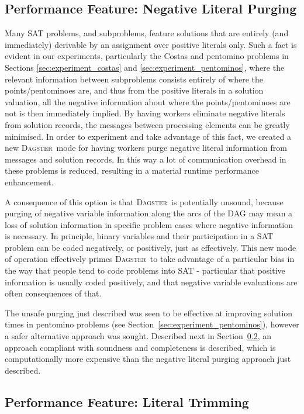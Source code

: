 \documentclass[10pt,a4paper,oneside,headinclude,footinclude,BCOR5mm]{scrartcl}
\newcommand{\dagster}{\textsc{Dagster}\xspace}
\begin{document}
\subsection{Performance Feature: Negative Literal Purging}\label{sec:negative_literal_purging}

Many SAT problems, and subproblems, feature solutions that are entirely (and immediately) derivable by an assignment over positive literals only.
Such a fact is evident in our experiments, particularly the Costas and pentomino problems in Sections \ref{sec:experiment_costas} and \ref{sec:experiment_pentominos}, where the relevant information between subproblems consists entirely of where the points/pentominoes are, and thus from the positive literals in a solution valuation, all the negative information about where the points/pentominoes are not is then immediately implied.
By having workers eliminate negative literals from solution records, the messages between processing elements can be greatly minimised.
In order to experiment and take advantage of this fact, we created a new \dagster\ mode for having workers purge negative literal information from messages and solution records.
In this way a lot of communication overhead in these problems is reduced, resulting in a material runtime performance enhancement. 

A consequence of this option is that \dagster\ is potentially unsound, because purging of negative variable information along the arcs of the DAG may mean a loss of solution information in specific problem cases where negative information is necessary.
In principle, binary variables and their participation in a SAT problem can be coded negatively, or positively, just as effectively.
This new mode of operation effectively primes \dagster\ to take advantage of a particular bias in the way that people tend to code problems into SAT - particular that positive information is usually coded positively, and that negative variable evaluations are often consequences of that.

The unsafe purging just described was seen to be effective at improving solution times in pentomino problems (see Section~\ref{sec:experiment_pentominos}), however a safer alternative approach was sought.
Described next in Section~\ref{sec:literal_trimming}, an approach compliant with soundness and completeness is described, which is  computationally more expensive than the negative literal purging approach just described.
 

\subsection{Performance Feature: Literal Trimming}\label{sec:literal_trimming}
\end{document}
